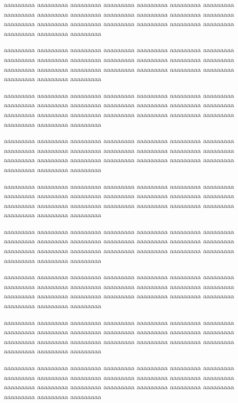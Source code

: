 \documentclass[11pt]{article}
\begin{document}
{   
   aaaaaaaaa aaaaaaaaa aaaaaaaaa aaaaaaaaa aaaaaaaaa aaaaaaaaa aaaaaaaaa aaaaaaaaa aaaaaaaaa aaaaaaaaa aaaaaaaaa aaaaaaaaa aaaaaaaaa aaaaaaaaa aaaaaaaaa aaaaaaaaa aaaaaaaaa aaaaaaaaa aaaaaaaaa aaaaaaaaa aaaaaaaaa aaaaaaaaa aaaaaaaaa aaaaaaaaa
   
   
   aaaaaaaaa aaaaaaaaa aaaaaaaaa aaaaaaaaa aaaaaaaaa aaaaaaaaa aaaaaaaaa aaaaaaaaa aaaaaaaaa aaaaaaaaa aaaaaaaaa aaaaaaaaa aaaaaaaaa aaaaaaaaa aaaaaaaaa aaaaaaaaa aaaaaaaaa aaaaaaaaa aaaaaaaaa aaaaaaaaa aaaaaaaaa aaaaaaaaa aaaaaaaaa aaaaaaaaa 
   
   
   aaaaaaaaa aaaaaaaaa aaaaaaaaa aaaaaaaaa aaaaaaaaa aaaaaaaaa aaaaaaaaa aaaaaaaaa aaaaaaaaa aaaaaaaaa aaaaaaaaa aaaaaaaaa aaaaaaaaa aaaaaaaaa aaaaaaaaa aaaaaaaaa aaaaaaaaa aaaaaaaaa aaaaaaaaa aaaaaaaaa aaaaaaaaa aaaaaaaaa aaaaaaaaa aaaaaaaaa 
   
   
   
   aaaaaaaaa aaaaaaaaa aaaaaaaaa aaaaaaaaa aaaaaaaaa aaaaaaaaa aaaaaaaaa aaaaaaaaa aaaaaaaaa aaaaaaaaa aaaaaaaaa aaaaaaaaa aaaaaaaaa aaaaaaaaa aaaaaaaaa aaaaaaaaa aaaaaaaaa aaaaaaaaa aaaaaaaaa aaaaaaaaa aaaaaaaaa aaaaaaaaa aaaaaaaaa aaaaaaaaa 
  
  
  aaaaaaaaa aaaaaaaaa aaaaaaaaa aaaaaaaaa aaaaaaaaa aaaaaaaaa aaaaaaaaa aaaaaaaaa aaaaaaaaa aaaaaaaaa aaaaaaaaa aaaaaaaaa aaaaaaaaa aaaaaaaaa aaaaaaaaa aaaaaaaaa aaaaaaaaa aaaaaaaaa aaaaaaaaa aaaaaaaaa aaaaaaaaa aaaaaaaaa aaaaaaaaa aaaaaaaaa 
  
  
  aaaaaaaaa aaaaaaaaa aaaaaaaaa aaaaaaaaa aaaaaaaaa aaaaaaaaa aaaaaaaaa aaaaaaaaa aaaaaaaaa aaaaaaaaa aaaaaaaaa aaaaaaaaa aaaaaaaaa aaaaaaaaa aaaaaaaaa aaaaaaaaa aaaaaaaaa aaaaaaaaa aaaaaaaaa aaaaaaaaa aaaaaaaaa aaaaaaaaa aaaaaaaaa aaaaaaaaa 
  
  
  aaaaaaaaa aaaaaaaaa aaaaaaaaa aaaaaaaaa aaaaaaaaa aaaaaaaaa aaaaaaaaa aaaaaaaaa aaaaaaaaa aaaaaaaaa aaaaaaaaa aaaaaaaaa aaaaaaaaa aaaaaaaaa aaaaaaaaa aaaaaaaaa aaaaaaaaa aaaaaaaaa aaaaaaaaa aaaaaaaaa aaaaaaaaa aaaaaaaaa aaaaaaaaa aaaaaaaaa 
  
  
  aaaaaaaaa aaaaaaaaa aaaaaaaaa aaaaaaaaa aaaaaaaaa aaaaaaaaa aaaaaaaaa aaaaaaaaa aaaaaaaaa aaaaaaaaa aaaaaaaaa aaaaaaaaa aaaaaaaaa aaaaaaaaa aaaaaaaaa aaaaaaaaa aaaaaaaaa aaaaaaaaa aaaaaaaaa aaaaaaaaa aaaaaaaaa aaaaaaaaa aaaaaaaaa aaaaaaaaa 
  
  aaaaaaaaa aaaaaaaaa aaaaaaaaa aaaaaaaaa aaaaaaaaa aaaaaaaaa aaaaaaaaa aaaaaaaaa aaaaaaaaa aaaaaaaaa aaaaaaaaa aaaaaaaaa aaaaaaaaa aaaaaaaaa aaaaaaaaa aaaaaaaaa aaaaaaaaa aaaaaaaaa aaaaaaaaa aaaaaaaaa aaaaaaaaa aaaaaaaaa aaaaaaaaa aaaaaaaaa 
  
}
\end{document}
